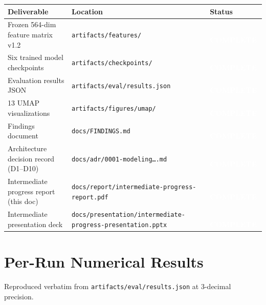 \documentclass[11pt,a4paper]{article}
\newcommand{\status}[1]{%
  \ifstrequal{#1}{complete}{\colorbox{brandAccent}{\textcolor{white}{\sffamily\bfseries\small\,COMPLETE\,}}}{%
  \ifstrequal{#1}{inprogress}{\colorbox{brandAmber}{\textcolor{white}{\sffamily\bfseries\small\,IN PROGRESS\,}}}{%
  \ifstrequal{#1}{planned}{\colorbox{brandSecondary}{\textcolor{white}{\sffamily\bfseries\small\,PLANNED\,}}}{%
  \ifstrequal{#1}{deferred}{\colorbox{brandSlate}{\textcolor{white}{\sffamily\bfseries\small\,DEFERRED\,}}}{}}}}%
}
\begin{document}
\begin{center}\small
{}
\begin{tabular}{@{}l l l@{}}
\toprule
\textbf{Deliverable} & \textbf{Location} & \textbf{Status} \\
\midrule
Frozen 564-dim feature matrix v1.2     & \texttt{artifacts/features/}             & \status{complete} \\
Six trained model checkpoints          & \texttt{artifacts/checkpoints/}          & \status{complete} \\
Evaluation results JSON                & \texttt{artifacts/eval/results.json}     & \status{complete} \\
13 UMAP visualizations                 & \texttt{artifacts/figures/umap/}         & \status{complete} \\
Findings document                      & \texttt{docs/FINDINGS.md}                & \status{complete} \\
Architecture decision record (D1--D10) & \texttt{docs/adr/0001-modeling\ldots.md} & \status{complete} \\
Intermediate progress report (this doc) & \texttt{docs/report/intermediate-progress-report.pdf} & \status{complete} \\
Intermediate presentation deck         & \texttt{docs/presentation/intermediate-progress-presentation.pptx} & \status{complete} \\
\bottomrule
\end{tabular}
\end{center}

\clearpage

\appendix
\section{Per-Run Numerical Results}
\label{app:results}

\noindent Reproduced verbatim from \texttt{artifacts/eval/results.json} at 3-decimal precision.
\end{document}
